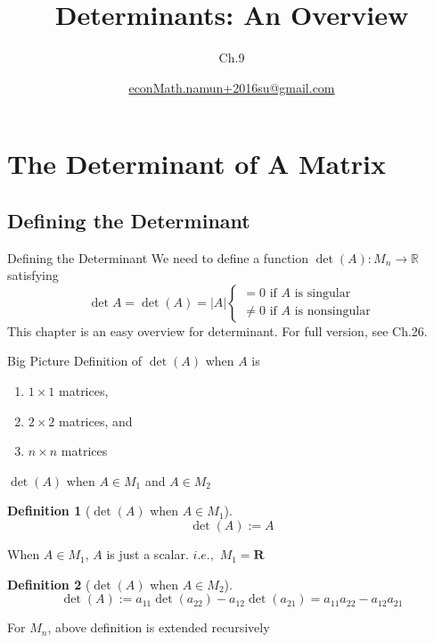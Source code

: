 \documentclass[a4paper,11pt]{article}
\author[조남운]{\url{econMath.namun+2016su@gmail.com}}
\title{Determinants: An Overview}
\subtitle{Ch.9}
\newtheorem{defn}{Definition}
\begin{document}
	
\maketitle


\section{The Determinant of A Matrix} %
\label{sec:the_determinant_of_a_matrix}
\subsection{Defining the Determinant} %
\label{sub:defining_the_determinant}
\begin{frame}[t]{Defining the Determinant}
	We need to define a function $\det(A): M_n \rightarrow \mathbb{R}$ satisfying
	\[
		\det A = \det(A) = \vert A\vert \begin{cases}
			= 0 \text{ if $A$ is singular}\\
			\neq 0 \text{ if $A$ is nonsingular}
		\end{cases}
	\]
	This chapter is an easy overview for determinant. For full version, see Ch.26.
	\begin{block}
		{Big Picture}
		Definition of $\det(A)$ when $A$ is 
		\begin{enumerate}
			\item $1\times 1$ matrices,
			\item $2\times 2$ matrices, and
			\item $n\times n$ matrices
		\end{enumerate}
	\end{block}
\end{frame}
\begin{frame}[t]{$\det(A)$ when $A\in M_1$ and $A\in M_2$}
	\begin{defn}
		[$\det(A)$ when $A\in M_1$]
		\[
			\det(A):=A
		\]
	\end{defn}
	When $A\in M_1$, $A$ is just a scalar. $i.e.,$ $M_1 = \mathbf{R}$
	\begin{defn}
		[$\det(A)$ when $A\in M_2$]
		\[
			\det(A):= a_{11} \det(a_{22}) - a_{12}\det(a_{21}) =a_{11}a_{22}-a_{12}a_{21}
		\]
	\end{defn}
	For $M_n$, above definition is extended recursively
\end{frame}
\end{document}

